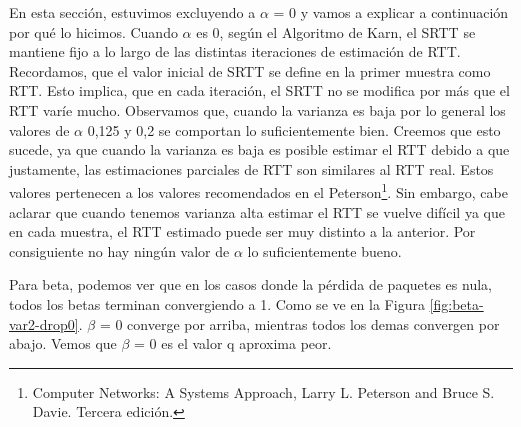 En esta sección, estuvimos excluyendo a $\alpha$ = 0 y vamos a explicar a continuación por qué lo hicimos. Cuando $\alpha$ es 0, según el Algoritmo de Karn, el SRTT se mantiene fijo a lo largo de las distintas iteraciones de estimación de RTT. Recordamos, que el valor inicial de SRTT se define en la primer muestra como RTT. Esto implica, que en cada iteración, el SRTT no se modifica por más que el RTT varíe mucho.
Observamos que, cuando la varianza es baja por lo general los valores de $\alpha$ 0,125 y 0,2 se comportan lo suficientemente bien. Creemos que esto sucede, ya que cuando la varianza es baja es posible estimar el RTT debido a que justamente, las estimaciones parciales de RTT son similares al RTT real. Estos valores pertenecen a los valores recomendados en el Peterson\footnote{Computer Networks: A Systems Approach, Larry L. Peterson and Bruce S. Davie. Tercera edición.}.
Sin embargo, cabe aclarar que cuando tenemos varianza alta estimar el RTT se vuelve difícil ya que en cada muestra, el RTT estimado puede ser muy distinto a la anterior. Por consiguiente no hay ningún valor de $\alpha$ lo suficientemente bueno.


Para beta, podemos ver que en los casos donde la p\'erdida de paquetes es nula, todos los betas terminan convergiendo a 1. Como se ve en la Figura \ref{fig:beta-var2-drop0}. $\beta$ = 0 converge por arriba, mientras todos los demas convergen por abajo. Vemos que $\beta$ = 0 es el valor q aproxima peor. 